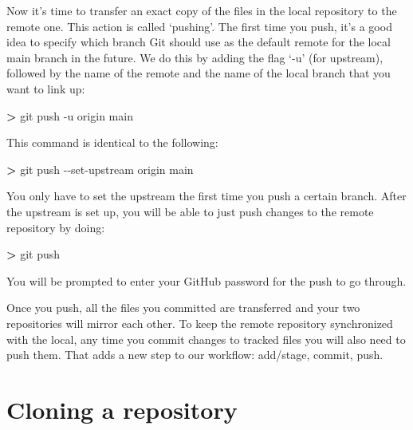 \documentclass[
]{book}
\newenvironment{Shaded}{\begin{snugshade}}{\end{snugshade}}
\newcommand{\AttributeTok}[1]{\textcolor[rgb]{0.13,0.29,0.53}{#1}}
\newcommand{\ExtensionTok}[1]{#1}
\newcommand{\NormalTok}[1]{#1}
\newcommand{\OperatorTok}[1]{\textcolor[rgb]{0.81,0.36,0.00}{\textbf{#1}}}
\begin{document}
Now it's time to transfer an exact copy of the files in the local repository to the remote one. This action is called `pushing'. The first time you push, it's a good idea to specify which branch Git should use as the default remote for the local main branch in the future. We do this by adding the flag `-u' (for upstream), followed by the name of the remote and the name of the local branch that you want to link up:

\begin{Shaded}
\begin{Highlighting}[]
\OperatorTok{\textgreater{}}\NormalTok{ git }\ExtensionTok{push} \AttributeTok{{-}u}\NormalTok{ origin main}
\end{Highlighting}
\end{Shaded}

This command is identical to the following:

\begin{Shaded}
\begin{Highlighting}[]
\OperatorTok{\textgreater{}}\NormalTok{ git }\ExtensionTok{push} \AttributeTok{{-}{-}set{-}upstream}\NormalTok{ origin main}
\end{Highlighting}
\end{Shaded}

You only have to set the upstream the first time you push a certain branch. After the upstream is set up, you will be able to just push changes to the remote repository by doing:

\begin{Shaded}
\begin{Highlighting}[]
\OperatorTok{\textgreater{}}\NormalTok{ git }\ExtensionTok{push}
\end{Highlighting}
\end{Shaded}

You will be prompted to enter your GitHub password for the push to go through.

Once you push, all the files you committed are transferred and your two repositories will mirror each other. To keep the remote repository synchronized with the local, any time you commit changes to tracked files you will also need to push them. That adds a new step to our workflow: add/stage, commit, push.

\hypertarget{cloning-a-repository}{%
\section{Cloning a repository}\label{cloning-a-repository}}
\end{document}
